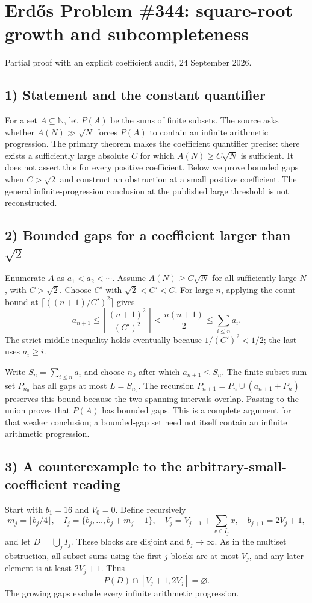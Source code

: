 \section{Erd\H{o}s Problem \#344: square-root growth and subcompleteness}
\noindent Partial proof with an explicit coefficient audit, 24 September 2026.

\subsection*{1) Statement and the constant quantifier}
For a set $A\subseteq\mathbb N$, let $P(A)$ be the sums of finite subsets. The source asks whether $A(N)\gg\sqrt N$ forces $P(A)$ to contain an infinite arithmetic progression. The primary theorem makes the coefficient quantifier precise: there exists a sufficiently large absolute $C$ for which $A(N)\ge C\sqrt N$ is sufficient. It does not assert this for every positive coefficient. Below we prove bounded gaps when $C>\sqrt2$ and construct an obstruction at a small positive coefficient. The general infinite-progression conclusion at the published large threshold is not reconstructed.

\subsection*{2) Bounded gaps for a coefficient larger than $\sqrt2$}
Enumerate $A$ as $a_1<a_2<\cdots$. Assume $A(N)\ge C\sqrt N$ for all sufficiently large $N$, with $C>\sqrt2$. Choose $C'$ with $\sqrt2<C'<C$. For large $n$, applying the count bound at $\lceil((n+1)/C')^2\rceil$ gives
\[a_{n+1}\le\left\lceil\frac{(n+1)^2}{(C')^2}\right\rceil<\frac{n(n+1)}2\le\sum_{i\le n}a_i.
\]
The strict middle inequality holds eventually because $1/(C')^2<1/2$; the last uses $a_i\ge i$.

Write $S_n=\sum_{i\le n}a_i$ and choose $n_0$ after which $a_{n+1}\le S_n$. The finite subset-sum set $P_{n_0}$ has all gaps at most $L=S_{n_0}$. The recursion $P_{n+1}=P_n\cup(a_{n+1}+P_n)$ preserves this bound because the two spanning intervals overlap. Passing to the union proves that $P(A)$ has bounded gaps. This is a complete argument for that weaker conclusion; a bounded-gap set need not itself contain an infinite arithmetic progression.

\subsection*{3) A counterexample to the arbitrary-small-coefficient reading}
Start with $b_1=16$ and $V_0=0$. Define recursively
\[m_j=\lfloor b_j/4\rfloor,\quad I_j=\{b_j,\ldots,b_j+m_j-1\},\quad
V_j=V_{j-1}+\sum_{x\in I_j}x,\quad b_{j+1}=2V_j+1,
\]
and let $D=\bigcup_j I_j$. These blocks are disjoint and $b_j\to\infty$. As in the multiset obstruction, all subset sums using the first $j$ blocks are at most $V_j$, and any later element is at least $2V_j+1$. Thus
\[P(D)\cap[V_j+1,2V_j]=\varnothing.
\tag{1}\]
The growing gaps exclude every infinite arithmetic progression.

